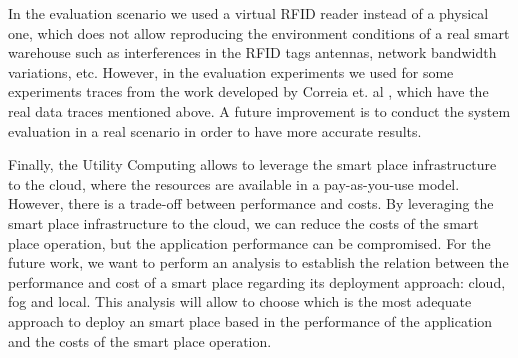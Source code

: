 In the evaluation scenario we used a virtual RFID reader instead of a physical one, which
does not allow reproducing the environment conditions of a real smart warehouse such as interferences
in the RFID tags antennas, network bandwidth variations, etc. However, in the evaluation experiments
we used for some experiments traces from the work developed by Correia et. al \cite{Correia:Thesis:2014},
which have the real data traces mentioned above. A future improvement is to conduct the system evaluation
in a real scenario in order to have more accurate results.

Finally, the Utility Computing allows to leverage the smart place infrastructure to the cloud,
where the resources are available in a pay-as-you-use model. However, there is a
trade-off between performance and costs. By leveraging the smart place infrastructure
to the cloud, we can reduce the costs of the smart place operation, but the
application performance can be compromised. For the future work, we want to perform
an analysis to establish the relation between the performance and cost of a smart place
regarding its deployment approach: cloud, fog and local. This analysis will allow
to choose which is the most adequate approach to deploy an smart place based in
the performance of the application and the costs of the smart place operation.
